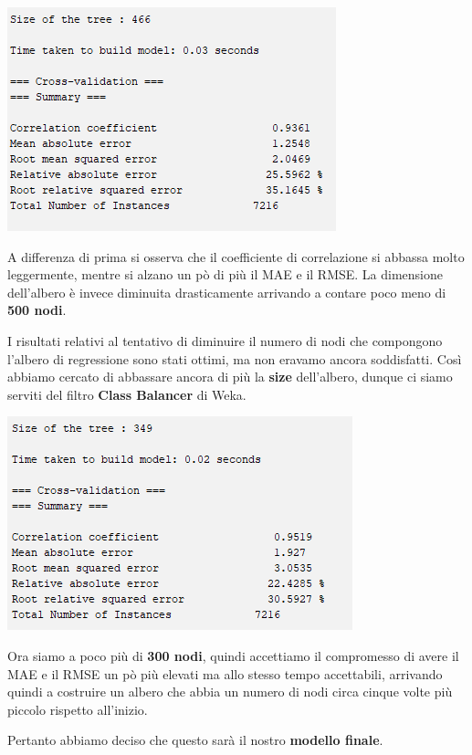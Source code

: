 \documentclass[a4paper, 11pt, oneside]{report}
\begin{document}
                \begin{center}
                    \includegraphics[scale=0.85]{metricheMinNum10}
                \end{center}
                \par \noindent A differenza di prima si osserva che il coefficiente di correlazione si abbassa molto leggermente,
                mentre si alzano un pò di più il MAE e il RMSE.
                La dimensione dell'albero è invece diminuita drasticamente arrivando a contare poco meno di \textbf{500 nodi}.
                \\
                \par \noindent I risultati relativi al tentativo di diminuire il numero di nodi che compongono l'albero di
                regressione sono stati ottimi, ma non eravamo ancora soddisfatti.
                Così abbiamo cercato di abbassare ancora di più la \textbf{size} dell'albero, dunque ci siamo serviti del
                filtro \textbf{Class Balancer} di Weka.

                \begin{center}
                    \includegraphics[scale=0.85]{metricheDefinitive}
                \end{center}
                \par \noindent Ora siamo a poco più di \textbf{300 nodi}, quindi accettiamo il compromesso di avere il
                MAE e il RMSE un pò più elevati ma allo stesso tempo accettabili,
                arrivando quindi a costruire un albero che abbia un numero di nodi circa cinque volte più piccolo rispetto all'inizio.
                \par \noindent Pertanto abbiamo deciso che questo sarà il nostro \textbf{modello finale}.
\end{document}
